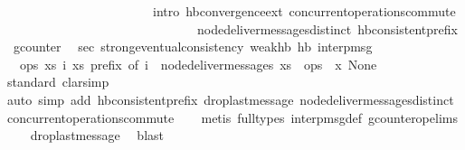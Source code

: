 \begin{isabellebody}
\ \ \ \ \ \ \ \ \ \ \ \ \ \ \ \ \ \ \ \ \ \ \ intro{\isacharcolon}\ hb{\isachardot}convergence{\isacharunderscore}ext\ concurrent{\isacharunderscore}operations{\isacharunderscore}commute\isanewline
\ \ \ \ \ \ \ \ \ \ \ \ \ \ \ \ \ \ \ \ \ \ \ \ \ \ \ \ \ \ node{\isacharunderscore}deliver{\isacharunderscore}messages{\isacharunderscore}distinct\ hb{\isacharunderscore}consistent{\isacharunderscore}prefix{\isacharparenright}%
\endisatagproof
{\isafoldproof}%
%
\isadelimproof
\isanewline
%
\endisadelimproof
\isanewline
{}\isamarkupfalse%
\ gcounter\ \isanewline
\isanewline
{}\isamarkupfalse%
\ sec{\isacharcolon}\ strong{\isacharunderscore}eventual{\isacharunderscore}consistency\ weak{\isacharunderscore}hb\ hb\ interp{\isacharunderscore}msg\isanewline
\ \ {\isachardoublequoteopen}{\isasymlambda}ops{\isachardot}\ {\isasymexists}xs\ i{\isachardot}\ xs\ prefix\ of\ i\ {\isasymand}\ node{\isacharunderscore}deliver{\isacharunderscore}messages\ xs\ {\isacharequal}\ ops{\isachardoublequoteclose}\ {\isachardoublequoteopen}{\isasymlambda}\ x{\isachardot}\ None{\isachardoublequoteclose}\isanewline
%
\isadelimproof
\ \ %
\endisadelimproof
%
\isatagproof
{}\isamarkupfalse%
{\isacharparenleft}standard{\isacharsemicolon}\ clarsimp{\isacharparenright}\isanewline
\ \ \ \ \ \ \isamarkupfalse%
{\isacharparenleft}auto\ simp\ add{\isacharcolon}\ hb{\isacharunderscore}consistent{\isacharunderscore}prefix\ drop{\isacharunderscore}last{\isacharunderscore}message\ node{\isacharunderscore}deliver{\isacharunderscore}messages{\isacharunderscore}distinct\ concurrent{\isacharunderscore}operations{\isacharunderscore}commute{\isacharparenright}\isanewline
\ \ \ \isamarkupfalse%
{\isacharparenleft}metis\ {\isacharparenleft}full{\isacharunderscore}types{\isacharparenright}\ interp{\isacharunderscore}msg{\isacharunderscore}def\ gcounter{\isacharunderscore}op{\isachardot}elims{\isacharparenright}\isanewline
\ \ \isamarkupfalse%
\ drop{\isacharunderscore}last{\isacharunderscore}message\ \isamarkupfalse%
\ blast\isanewline
\ \ \isamarkupfalse%
%
\endisatagproof
{\isafoldproof}%
%
\isadelimproof
\isanewline
%
\endisadelimproof
{}\isamarkupfalse%
\isanewline
%
\isadelimtheory
\isanewline
%
\endisadelimtheory
%
\isatagtheory
{}\isamarkupfalse%
%
\endisatagtheory
{\isafoldtheory}%
%
\isadelimtheory
%
\endisadelimtheory
%
\end{isabellebody}
